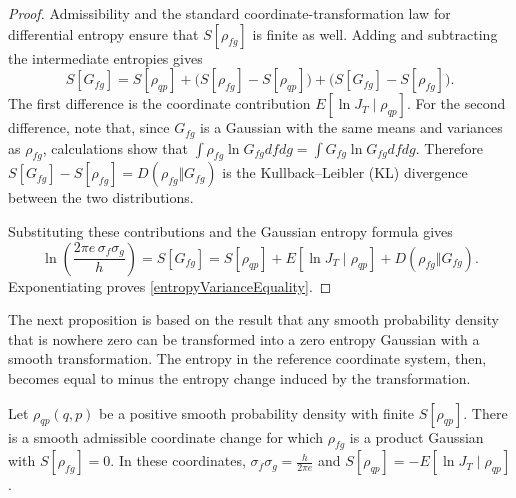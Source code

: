 \documentclass{techbrief}
\begin{document}
\begin{proof}
	Admissibility and the standard coordinate-transformation law for differential entropy \cite[Lemma 2]{RioulCosta} ensure that $S[\rho_{fg}]$ is finite as well. Adding and subtracting the intermediate entropies gives
	\begin{equation*}
		S[G_{fg}]=S[\rho_{qp}]+\bigl(S[\rho_{fg}]-S[\rho_{qp}]\bigr)+\bigl(S[G_{fg}]-S[\rho_{fg}]\bigr).
	\end{equation*}
	The first difference is the coordinate contribution $E[\ln J_T\mid\rho_{qp}]$. For the second difference, note that, since $G_{fg}$ is a Gaussian with the same means and variances as $\rho_{fg}$, calculations show that $\int \rho_{fg} \ln G_{fg} df dg = \int G_{fg}  \ln G_{fg} df dg$. Therefore $S[G_{fg}]-S[\rho_{fg}] = D(\rho_{fg}\Vert G_{fg})$ is the Kullback--Leibler (KL) divergence between the two distributions.

	Substituting these contributions and the Gaussian entropy formula \cite[Section 8.4]{CoverThomas} gives
	\begin{equation*}
		\ln\left(\frac{2\pi e\,\sigma_f\sigma_g}{h}\right)=S[G_{fg}]=S[\rho_{qp}]+E[\ln J_T\mid\rho_{qp}]+D(\rho_{fg}\Vert G_{fg}).
	\end{equation*}
	Exponentiating proves \eqref{entropyVarianceEquality}.
\end{proof}

The next proposition is based on the result that any smooth probability density that is nowhere zero can be transformed into a zero entropy Gaussian with a smooth transformation. The entropy in the reference coordinate system, then, becomes equal to minus the entropy change induced by the transformation.

\begin{prop}\label{smoothEntropyCoordinates}
	Let $\rho_{qp}(q,p)$ be a positive smooth probability density with finite $S[\rho_{qp}]$. There is a smooth admissible coordinate change for which $\rho_{fg}$ is a product Gaussian with $S[\rho_{fg}]=0$. In these coordinates, $\sigma_f\sigma_g=\frac{h}{2\pi e}$ and $S[\rho_{qp}]=-E[\ln J_T\mid\rho_{qp}]$.
\end{prop}
\end{document}
